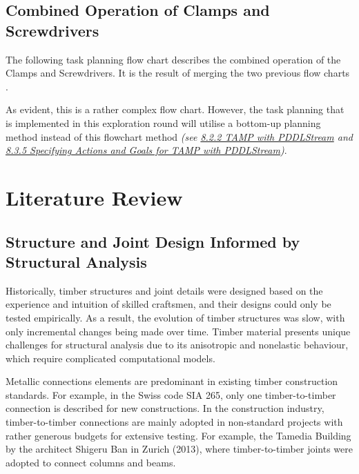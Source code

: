 \subsection{Combined Operation of Clamps and Screwdrivers}
\label{subsection:exploration_5_combined_operation_of_clamps_and_screwdrivers}

The following task planning flow chart describes the combined operation of the Clamps and Screwdrivers. It is the result of merging the two previous flow charts .




As evident, this is a rather complex flow chart. However, the task planning that is implemented in this exploration round will utilise a bottom-up planning method instead of this flowchart method \textit{(see \ul{8.2.2 TAMP with PDDLStream} and \ul{8.3.5 Specifying Actions and Goals for TAMP with PDDLStream})}.

\section{Literature Review}
\label{section:exploration_5_literature_review}

\subsection{Structure and Joint Design Informed by Structural Analysis}
\label{subsection:exploration_5_structure_and_joint_design_informed_by_structural_analysis}

Historically, timber structures and joint details were designed based on the experience and intuition of skilled craftsmen, and their designs could only be tested empirically. As a result, the evolution of timber structures was slow, with only incremental changes being made over time. Timber material presents unique challenges for structural analysis due to its anisotropic and nonelastic behaviour, which require complicated computational models. 

Metallic connections elements are predominant in existing timber construction standards. For example, in the Swiss code SIA 265, only one timber-to-timber connection is described for new constructions. In the construction industry, timber-to-timber connections are mainly adopted in non-standard projects with rather generous budgets for extensive testing. For example, the Tamedia Building by the architect Shigeru Ban in Zurich (2013), where timber-to-timber joints were adopted to connect columns and beams. \parencite{tanadiniAnalysisDesignTimbertotimber2021}


